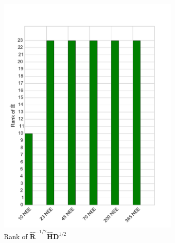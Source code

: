 \documentclass[11pt]{article}
\begin{document}
\begin{figure}[ht]
    \centering
    \begin{subfigure}[b]{0.4\textwidth}
        \includegraphics[width=\textwidth]{dalec2_obsrankcvtwind.pdf}
        \caption{Rank of $\hat{\textbf{R}}^{-1/2}\hat{\textbf{H}}\textbf{D}^{1/2}$}
        \label{fig:D2_observailityrankcvtwind}
    \end{subfigure}
    \begin{subfigure}[b]{0.4\textwidth}

\end{subfigure}
\end{figure}
\end{document}
